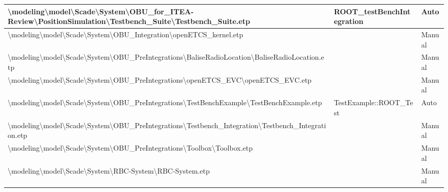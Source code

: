 \begin{longtable}{|>{\RaggedRight}p{}|>{\RaggedRight}p{}|>{\RaggedRight}p{}|}
\hline
\textbackslash modeling\textbackslash \allowbreak model\textbackslash \allowbreak Scade\textbackslash \allowbreak System\textbackslash \allowbreak OBU\_\allowbreak for\_\allowbreak ITEA-Review\textbackslash \allowbreak PositionSimulation\textbackslash \allowbreak Testbench\_\allowbreak Suite\textbackslash \allowbreak Testbench\_\allowbreak Suite.etp&ROOT\_\allowbreak testBenchIntegration&Auto\\
\hline
\textbackslash modeling\textbackslash \allowbreak model\textbackslash \allowbreak Scade\textbackslash \allowbreak System\textbackslash \allowbreak OBU\_\allowbreak Integration\textbackslash \allowbreak openETCS\_\allowbreak kernel.etp& &Manual\\
\hline
\textbackslash modeling\textbackslash \allowbreak model\textbackslash \allowbreak Scade\textbackslash \allowbreak System\textbackslash \allowbreak OBU\_\allowbreak PreIntegrations\textbackslash \allowbreak BaliseRadioLocation\textbackslash \allowbreak BaliseRadioLocation.etp& &Manual\\
\hline
\textbackslash modeling\textbackslash \allowbreak model\textbackslash \allowbreak Scade\textbackslash \allowbreak System\textbackslash \allowbreak OBU\_\allowbreak PreIntegrations\textbackslash \allowbreak openETCS\_\allowbreak EVC\textbackslash \allowbreak openETCS\_\allowbreak EVC.etp& &Manual\\
\hline
\textbackslash modeling\textbackslash \allowbreak model\textbackslash \allowbreak Scade\textbackslash \allowbreak System\textbackslash \allowbreak OBU\_\allowbreak PreIntegrations\textbackslash \allowbreak TestBenchExample\textbackslash \allowbreak TestBenchExample.etp&TestExample::ROOT\_\allowbreak Test&Auto\\
\hline
\textbackslash modeling\textbackslash \allowbreak model\textbackslash \allowbreak Scade\textbackslash \allowbreak System\textbackslash \allowbreak OBU\_\allowbreak PreIntegrations\textbackslash \allowbreak Testbench\_\allowbreak Integration\textbackslash \allowbreak Testbench\_\allowbreak Integration.etp& &Manual\\
\hline
\textbackslash modeling\textbackslash \allowbreak model\textbackslash \allowbreak Scade\textbackslash \allowbreak System\textbackslash \allowbreak OBU\_\allowbreak PreIntegrations\textbackslash \allowbreak Toolbox\textbackslash \allowbreak Toolbox.etp& &Manual\\
\hline
\textbackslash modeling\textbackslash \allowbreak model\textbackslash \allowbreak Scade\textbackslash \allowbreak System\textbackslash \allowbreak RBC-System\textbackslash \allowbreak RBC-System.etp& &Manual\\

\end{longtable}
